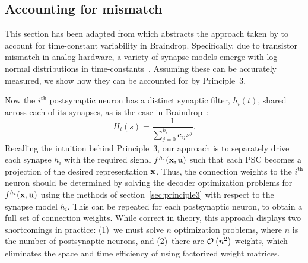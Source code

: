 \subsection{Accounting for mismatch}
\label{sec:mismatch}

This section has been adapted from \citet{voelker2017neuromorphic} which abstracts the approach taken by \citet{voelker2017iscas} to account for time-constant variability in Braindrop.
Specifically, due to transistor mismatch in analog hardware, a variety of synapse models emerge with log-normal distributions in time-constants~\citep{benjamintemp2019}.
Assuming these can be accurately measured, we show how they can be accounted for by Principle~3.

Now the $i^\text{th}$ postsynaptic neuron has a distinct synaptic filter, $h_{i}(t)$, shared across each of its synapses, as is the case in Braindrop~\citep{braindrop2019}:
\begin{equation} \label{eq:synapse-general}
H_i(s) = \frac{1}{\sum_{j=0}^{k_i} c_{ij} s^j} \text{.}
\end{equation}
Recalling the intuition behind Principle~3, our approach is to separately drive each synapse $h_{i}$ with the required signal $f^{h_i}(\mathbf{x}, \mathbf{u})$ such that each PSC becomes a projection of the desired representation $\mathbf{x}$.
Thus, the connection weights to the $i^\text{th}$ neuron should be determined by solving the decoder optimization problems for $f^{h_i}(\mathbf{x}, \mathbf{u})$ using the methods of section~\ref{sec:principle3} with respect to the synapse model $h_i$. 
This can be repeated for each postsynaptic neuron, to obtain a full set of connection weights.
While correct in theory, this approach displays two shortcomings in practice: (1)~we must solve $n$ optimization problems, where $n$ is the number of postsynaptic neurons, and (2)~there are $\mathcal{O}\left({n^2}\right)$ weights, which eliminates the space and time efficiency of using factorized weight matrices.

